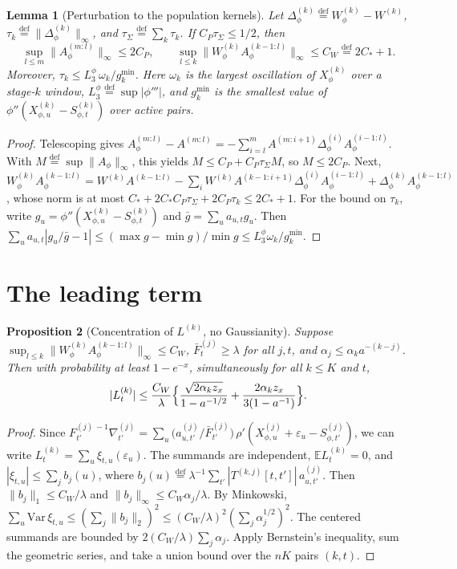 \documentclass[11pt]{article}
\newcommand{\E}{\mathbb{E}}
\newcommand{\defeq}{\stackrel{\mathrm{def}}{=}}
\newcommand{\norm}[1]{\lVert#1\rVert}
\newtheorem{proposition}{Proposition}
\newtheorem{lemma}[proposition]{Lemma}
\theoremstyle{definition}
\begin{document}
\begin{lemma}[Perturbation to the population kernels]\label{lem:perturb}
Let \(\Delta^{(k)}_\phi\defeq W^{(k)}_\phi-W^{(k)}\),
\(\tau_k\defeq\norm{\Delta^{(k)}_\phi}_\infty\), and
\(\tau_\Sigma\defeq\sum_k\tau_k\).  If \(C_P\tau_\Sigma\le1/2\), then
\[
  \sup_{l\le m}\norm{A^{(m:l)}_\phi}_\infty\le2C_P,\qquad
  \sup_{l\le k}\norm{W^{(k)}_\phi A^{(k-1:l)}_\phi}_\infty\le C_W\defeq2C_*+1 .
\]
Moreover, \(\tau_k\le L^\phi_3\,\omega_k/g^{\min}_k\).  Here \(\omega_k\) is
the largest oscillation of \(X^{(k)}_\phi\) over a stage-\(k\) window,
\(L^\phi_3\defeq\sup|\phi'''|\), and \(g^{\min}_k\) is the smallest value of
\(\phi''(X^{(k)}_{\phi,u}-S^{(k)}_{\phi,t})\) over active pairs.
\end{lemma}

\begin{proof}
Telescoping gives
\(A^{(m:l)}_\phi-A^{(m:l)}=-\sum_{i=l}^mA^{(m:i+1)}\Delta^{(i)}_\phi A^{(i-1:l)}_\phi\).
With \(M\defeq\sup\norm{A_\phi}_\infty\), this yields
\(M\le C_P+C_P\tau_\Sigma M\), so \(M\le2C_P\).  Next,
\(W^{(k)}_\phi A^{(k-1:l)}_\phi=W^{(k)}A^{(k-1:l)}-\sum_iW^{(k)}A^{(k-1:i+1)}\Delta^{(i)}_\phi A^{(i-1:l)}_\phi+\Delta^{(k)}_\phi A^{(k-1:l)}_\phi\),
whose norm is at most \(C_*+2C_*C_P\tau_\Sigma+2C_P\tau_k\le2C_*+1\).
For the bound on \(\tau_k\), write \(g_u=\phi''(X^{(k)}_{\phi,u}-S^{(k)}_{\phi,t})\)
and \(\bar g=\sum_ua_{u,t}g_u\).  Then
\(\sum_ua_{u,t}|g_u/\bar g-1|\le(\max g-\min g)/\min g\le L^\phi_3\omega_k/g^{\min}_k\).
\end{proof}

\section{The leading term}

\begin{proposition}[Concentration of \(L^{(k)}\), no Gaussianity]\label{prop:leading}
Suppose \(\sup_{l\le k}\norm{W^{(k)}_\phi A^{(k-1:l)}_\phi}_\infty\le C_W\),
\(\bar F^{(j)}_t\ge\lambda\) for all \(j,t\), and
\(\alpha_j\le\alpha_ka^{-(k-j)}\).  Then with probability at least
\(1-e^{-x}\), simultaneously for all \(k\le K\) and \(t\),
\[
  |L^{(k)}_t|\le\frac{C_W}{\lambda}\Bigl\{
    \frac{\sqrt{2\alpha_kz_x}}{1-a^{-1/2}}
    +\frac{2\alpha_kz_x}{3(1-a^{-1})}\Bigr\}.
\]
\end{proposition}

\begin{proof}
Since \(F^{(j)\,-1}_{t'}\nabla^{(j)}_{t'}=\sum_u\bigl(a^{(j)}_{u,t'}/\bar F^{(j)}_{t'}\bigr)\,\rho'(X^{(j)}_{\phi,u}+\varepsilon_u-S^{(j)}_{\phi,t'})\),
we can write \(L^{(k)}_t=\sum_u\xi_{t,u}(\varepsilon_u)\).  The summands are
independent, \(\E L^{(k)}_t=0\), and \(|\xi_{t,u}|\le\sum_jb_j(u)\), where
\(b_j(u)\defeq\lambda^{-1}\sum_{t'}|T^{(k,j)}[t,t']|\,a^{(j)}_{u,t'}\).  Then
\(\norm{b_j}_1\le C_W/\lambda\) and \(\norm{b_j}_\infty\le C_W\alpha_j/\lambda\).
By Minkowski,
\(\sum_u\mathrm{Var}\,\xi_{t,u}\le(\sum_j\norm{b_j}_2)^2\le(C_W/\lambda)^2(\sum_j\alpha_j^{1/2})^2\).
The centered summands are bounded by \(2(C_W/\lambda)\sum_j\alpha_j\).
Apply Bernstein's inequality, sum the geometric series, and take a union
bound over the \(nK\) pairs \((k,t)\).
\end{proof}
\end{document}
